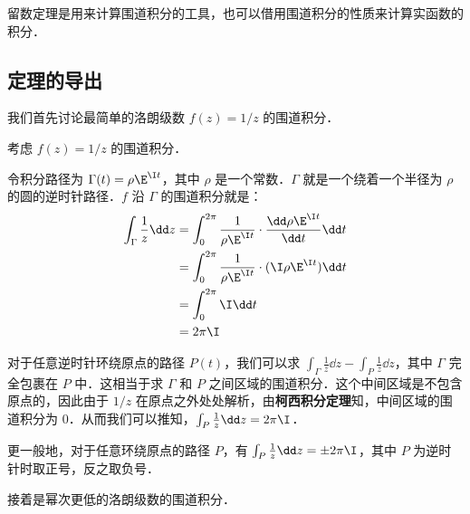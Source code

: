 

留数定理是用来计算围道积分的工具，也可以借用围道积分的性质来计算实函数的积分．

\subsection{定理的导出}

我们首先讨论最简单的洛朗级数 $f(z)=1/z$ 的围道积分．

\begin{example}{}\label{ResThe_ex1}
考虑 $f(z)=1/z$ 的围道积分．

令积分路径为 $\Gamma(t)=\rho\E^{\I t}$，其中 $\rho$ 是一个常数．$\Gamma$ 就是一个绕着一个半径为 $\rho$ 的圆的逆时针路径．$f$ 沿 $\Gamma$ 的围道积分就是：
\begin{equation}\label{ResThe_eq1}
\begin{aligned}
\int_{\Gamma}\frac{1}{z}\dd z&=\int^{2\pi}_0\frac{1}{\rho\E^{\I t}}\cdot\frac{\dd\rho\E^{\I t}}{\dd t}\dd t\\
&=\int_0^{2\pi}\frac{1}{\rho\E^{\I t}}\cdot (\I \rho \E^{\I t})\dd t\\
&=\int_0^{2\pi}\I\dd t\\
&=2\pi\I
\end{aligned}
\end{equation}

对于任意逆时针环绕原点的路径 $P(t)$，我们可以求 $\int_{\Gamma}\frac{1}{z}\dd z-\int_{P}\frac{1}{z}\dd z$，其中 $\Gamma$ 完全包裹在 $P$ 中．这相当于求 $\Gamma$ 和 $P$ 之间区域的围道积分．这个中间区域是不包含原点的，因此由于 $1/z$ 在原点之外处处解析，由\textbf{柯西积分定理}知，中间区域的围道积分为 $0$．从而我们可以推知，$\int_{P}\frac{1}{z}\dd z=2\pi\I$．

更一般地，对于任意环绕原点的路径 $P$，有 $\int_{P}\frac{1}{z}\dd z=\pm 2\pi\I$，其中 $P$ 为逆时针时取正号，反之取负号．

\end{example}

接着是幂次更低的洛朗级数的围道积分．

